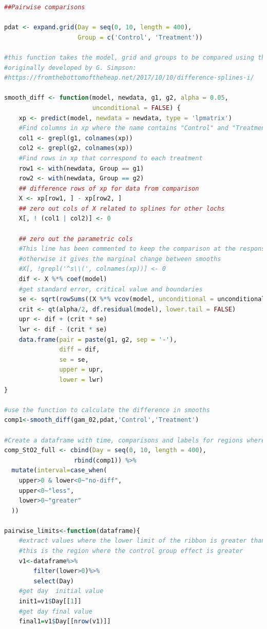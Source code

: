 \documentclass[
]{article}
\begin{document}
\begin{lstlisting}[language=R]
##Pairwise comparisons

pdat <- expand.grid(Day = seq(0, 10, length = 400),
                    Group = c('Control', 'Treatment'))

#this function takes the model, grid and groups to be compared using the lpmatrix
#originally developed by G. Simpson:
#https://fromthebottomoftheheap.net/2017/10/10/difference-splines-i/

smooth_diff <- function(model, newdata, g1, g2, alpha = 0.05,
                        unconditional = FALSE) {
    xp <- predict(model, newdata = newdata, type = 'lpmatrix')
    #Find columns in xp where the name contains "Control" and "Treatment"
    col1 <- grepl(g1, colnames(xp))
    col2 <- grepl(g2, colnames(xp))
    #Find rows in xp that correspond to each treatment
    row1 <- with(newdata, Group == g1)
    row2 <- with(newdata, Group == g2)
    ## difference rows of xp for data from comparison
    X <- xp[row1, ] - xp[row2, ]
    ## zero out cols of X related to splines for other lochs
    X[, ! (col1 | col2)] <- 0
    
    ## zero out the parametric cols
    #This line has been commented to keep the comparison at the response level,
    #otherwise it gives the marginal change between smooths
    #X[, !grepl('^s\\(', colnames(xp))] <- 0
    dif <- X %*% coef(model)
    #get standard error, critical value and boundaries
    se <- sqrt(rowSums((X %*% vcov(model, unconditional = unconditional)) * X))
    crit <- qt(alpha/2, df.residual(model), lower.tail = FALSE)
    upr <- dif + (crit * se)
    lwr <- dif - (crit * se)
    data.frame(pair = paste(g1, g2, sep = '-'),
               diff = dif,
               se = se,
               upper = upr,
               lower = lwr)
}

#use the function to calculate the difference in smooths
comp1<-smooth_diff(gam_02,pdat,'Control','Treatment')

#Create a dataframe with time, comparisons and labels for regions where difference exists
comp_StO2_full <- cbind(Day = seq(0, 10, length = 400),
                   rbind(comp1)) %>%
  mutate(interval=case_when(
    upper>0 & lower<0~"no-diff",
    upper<0~"less",
    lower>0~"greater"
  ))

pairwise_limits<-function(dataframe){
    #extract values where the lower limit of the ribbon is greater than zero
    #this is the region where the control group effect is greater
    v1<-dataframe%>%
        filter(lower>0)%>%
        select(Day)
    #get day  initial value
    init1=v1$Day[[1]]
    #get day final value
    final1=v1$Day[[nrow(v1)]]


\end{lstlisting}
\end{document}

